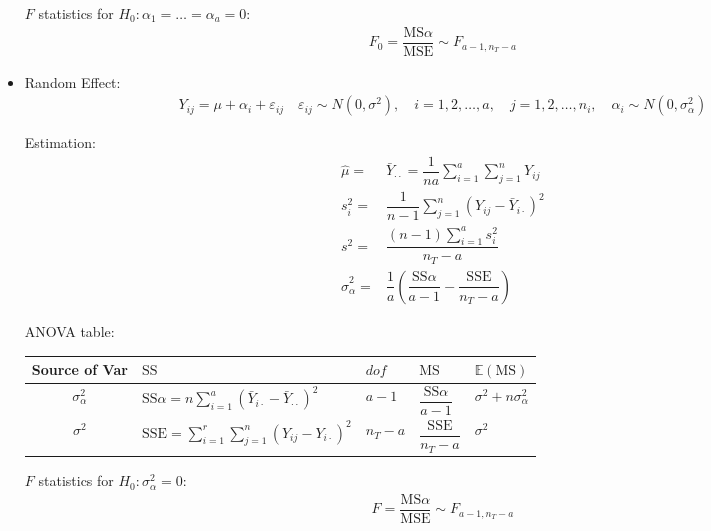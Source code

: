 \begin{itemize}[topsep=2pt,itemsep=0pt]
    $ F $ statistics for $ H_0:\alpha _1=\ldots=\alpha _a =0$:
    \begin{align}
        F_0=\dfrac{ \mathrm{ MS }\alpha   }{ \mathrm{ MSE }  }\sim F_{a-1,n_T-a}  
    \end{align}

    \item Random Effect:
    \begin{align*}
        Y_{ij} = \mu +\alpha_i+\varepsilon _{ij}\quad \varepsilon _{ij}\sim N(0,\sigma ^2),\quad i=1,2,\ldots,a,\quad j=1,2,\ldots,n_i,\quad \alpha _i\sim N(0,\sigma ^2_\alpha )
    \end{align*}
    
    Estimation:
    \begin{align}
        \hat{\mu }=&\bar{Y}_{\cdot \cdot }=\dfrac{1}{na}\sum_{i=1}^a\sum_{j=1}^{n}Y_{ij}\\
        s_i^2=&\dfrac{ 1 }{ n-1 }\sum_{j=1}^n(Y_{ij}-\bar{Y}_{i\cdot })^2\\
        s^2=&\dfrac{ (n-1)\sum_{i=1}^as_i^2 }{ n_T-a }\\
        \hat{\sigma }^2_\alpha =&\dfrac{ 1 }{ a } \left(\dfrac{ \mathrm{SS}\alpha  }{ a-1 } -\dfrac{ \mathrm{SSE}  }{ n_T-a }\right)
\end{align}    

    ANOVA table:
    \begin{table}[H]
        \centering
        \renewcommand\arraystretch{1.15}
        \begin{tabular}{cllll}
            \hline
            Source of Var&$ \mathrm{SS} $&$ dof $&$ \mathrm{MS}  $&$ \mathbb{E}\left( \mathrm{MS}  \right)  $\\
            \hline
            $ \sigma ^2_\alpha  $&$ \mathrm{SS}\alpha=n\sum_{i=1}^a\left(\bar{Y}_{i\cdot }-\bar{Y}_{\cdot \cdot }\right)^2  $&$ a-1 $&$ \dfrac{\mathrm{SS}\alpha  }{a-1} $&$ \sigma ^2+n\sigma _\alpha ^2 $\\
            $ \sigma ^2$&$ \mathrm{SSE} =\sum_{i=1}^r\sum_{j=1}^{n}\left(Y_{ij}-Y_{i\cdot }\right)^2 $&$ n_T-a $&$ \dfrac{\mathrm{SSE}}{n_T-a} $&$ \sigma ^2 $\\
            \hline
        \end{tabular}
    \end{table}

    $ F $ statistics for $ H_0:\sigma ^2_\alpha =0$:
    \begin{align}
        F=\dfrac{\mathrm{MS}\alpha }{\mathrm{MSE} } \sim F_{a-1,n_T-a}
    \end{align}


\end{itemize}

